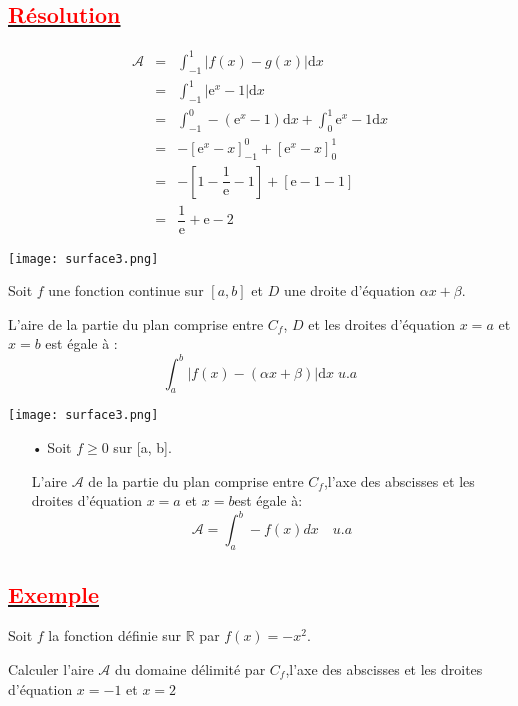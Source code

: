 \documentclass[12pt]{article}
\begin{document}
\subsection*{\underline{\textbf{\textcolor{red}{Résolution}}}}
\begin{eqnarray}
\mathcal{A} &=& \int_{-1}^{1}|f(x)-g(x)|\mathrm{d}x \nonumber \\
            &=& \int_{-1}^{1}|\mathrm{e}^{x}-1|\mathrm{d}x \nonumber \\
            &=& \int_{-1}^{0}-(\mathrm{e}^{x}-1)\mathrm{d}x+\int_{0}^{1}\mathrm{e}^{x}-1\mathrm{d}x \nonumber \\
            &=& -[\mathrm{e}^{x}-x]_{-1}^{0}+[\mathrm{e}^{x}-x]_{0}^{1} \nonumber \\
            &=& -\left[1-\dfrac{1}{\mathrm{e}}-1\right]+[\mathrm{e}-1-1] \nonumber \\
            &=& \dfrac{1}{\mathrm{e}}+\mathrm{e}-2 \nonumber
\end{eqnarray}

\begin{center}
    \texttt{[image: surface3.png]}
\end{center}

Soit $f$ une fonction continue sur $[a, b]$ et $D$ une droite d'équation $\alpha x + \beta.$

L'aire de la partie du plan comprise entre $C_{f}$, $D$ et les droites d'équation $x=a$ et $x=b$ est égale à :
$$\int_{a}^{b}|f(x)-(\alpha x+\beta)|\mathrm{d}x\;u.a$$

\begin{center}
   \texttt{[image: surface3.png]}
\end{center}
\begin{itemize}
\item[•] Soit $f\geq 0$ sur [a, b].

L'aire $\mathcal{A}$  de la partie du plan comprise entre $C_{f}$,l'axe des abscisses et les droites d'équation $x=a$ et $x=b$est égale à:
\[\mathcal{A}=\int_{a}^{b}-f(x)dx\quad u.a\]
\end{itemize}
\subsection*{\underline{\textbf{\textcolor{red}{Exemple}}}}
Soit $f$ la fonction définie sur $\mathbb{R}$ par $f(x)=-x^{2}$.

Calculer l'aire $\mathcal{A}$ du domaine délimité par $C_{f}$,l'axe des abscisses et les droites d'équation $x=-1$ et $x=2$
\end{document}
